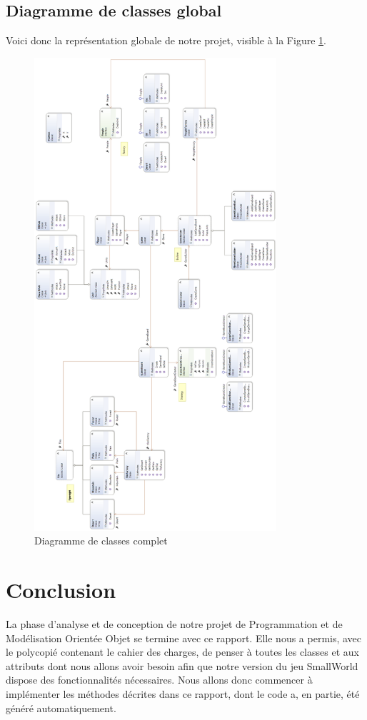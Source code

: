 \documentclass[a4paper]{article}
\begin{document}
\clearpage
	\subsection{Diagramme de classes global}
Voici donc la représentation globale de notre projet, visible à la Figure \ref{fig:class_global}.

\begin{figure}[ht]
\centering
	\includegraphics[width=0.8\textwidth, height=0.74\textheight]{../Schemas/class_global.png}
		\caption{Diagramme de classes complet}
		\label{fig:class_global}
\end{figure}

\clearpage
\section{Conclusion}
	La phase d'analyse et de conception de notre projet de Programmation et de Modélisation Orientée Objet se termine avec ce rapport.
Elle nous a permis, avec le polycopié contenant le cahier des charges, de penser à toutes les classes et aux attributs dont nous allons avoir besoin afin que notre version du jeu SmallWorld dispose des fonctionnalités nécessaires.
Nous allons donc commencer à implémenter les méthodes décrites dans ce rapport, dont le code a, en partie, été généré automatiquement.
\newpage
\listoffigures
\end{document}
